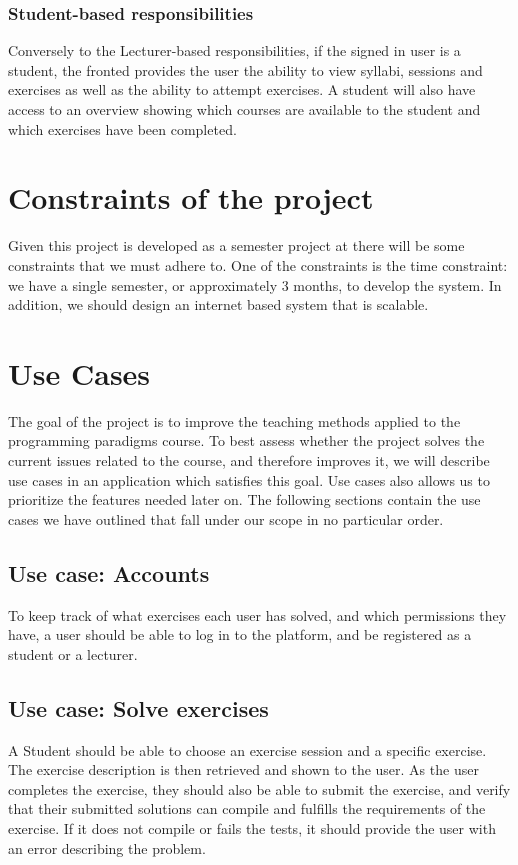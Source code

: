 \subsubsection*{Student-based responsibilities}
Conversely to the Lecturer-based responsibilities, if the signed in user is a student, the fronted provides the user the ability to view syllabi, sessions and exercises as well as the ability to attempt exercises. A student will also have access to an overview showing which courses are available to the student and which exercises have been completed. 


\section*{Constraints of the project}
Given this project is developed as a semester project at \aau{} there will be some constraints that we must adhere to. 
One of the constraints is the time constraint: we have a single semester, or approximately 3 months, to develop the system. 
In addition, we should design an internet based system that is scalable. 
 
\section*{Use Cases} \label{sec:use_cases}
The goal of the project is to improve the teaching methods applied to the programming paradigms course. 
To best assess whether the project solves the current issues related to the course, and therefore improves it, we will describe use cases in an application which satisfies this goal.
Use cases also allows us to prioritize the features needed later on.
The following sections contain the use cases we have outlined that fall under our scope in no particular order.  

\subsection*{Use case: Accounts}
To keep track of what exercises each user has solved, and which permissions they have, a user should be able to log in to the platform, and be registered as a student or a lecturer.

\subsection*{Use case: Solve exercises}
A Student should be able to choose an exercise session and a specific exercise. The exercise description is then retrieved and shown to the user.
As the user completes the exercise, they should also be able to submit the exercise, and verify that their submitted solutions can compile and fulfills the requirements of the exercise. If it does not compile or fails the tests, it should provide the user with an error describing the problem. 

